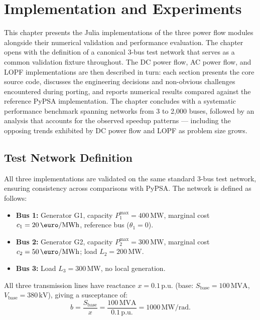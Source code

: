 \chapter{Implementation and Experiments}
\label{ch:implementation}

This chapter presents the Julia implementations of the three power flow modules alongside their numerical validation and performance evaluation. The chapter opens with the definition of a canonical 3-bus test network that serves as a common validation fixture throughout. The DC power flow, AC power flow, and LOPF implementations are then described in turn: each section presents the core source code, discusses the engineering decisions and non-obvious challenges encountered during porting, and reports numerical results compared against the reference PyPSA implementation. The chapter concludes with a systematic performance benchmark spanning networks from 3 to 2{,}000 buses, followed by an analysis that accounts for the observed speedup patterns --- including the opposing trends exhibited by DC power flow and LOPF as problem size grows.

\section{Test Network Definition}
\label{sec:test_network_definition}

All three implementations are validated on the same standard 3-bus test network, ensuring consistency across comparisons with PyPSA. The network is defined as follows:

\begin{itemize}
    \item \textbf{Bus 1:} Generator G1, capacity $P_1^\text{max} = 400\,\text{MW}$, marginal cost $c_1 = 20\,\text{\euro/MWh}$, reference bus ($\theta_1 = 0$).
    \item \textbf{Bus 2:} Generator G2, capacity $P_2^\text{max} = 300\,\text{MW}$, marginal cost $c_2 = 50\,\text{\euro/MWh}$; load $L_2 = 200\,\text{MW}$.
    \item \textbf{Bus 3:} Load $L_3 = 300\,\text{MW}$, no local generation.
\end{itemize}

All three transmission lines have reactance $x = 0.1\,\text{p.u.}$ (base: $S_\text{base} = 100\,\text{MVA}$, $V_\text{base} = 380\,\text{kV}$), giving a susceptance of:
\begin{equation}
    b = \frac{S_\text{base}}{x} = \frac{100\,\text{MVA}}{0.1\,\text{p.u.}} = 1000\,\text{MW/rad}.
    \label{eq:susceptance_value}
\end{equation}

